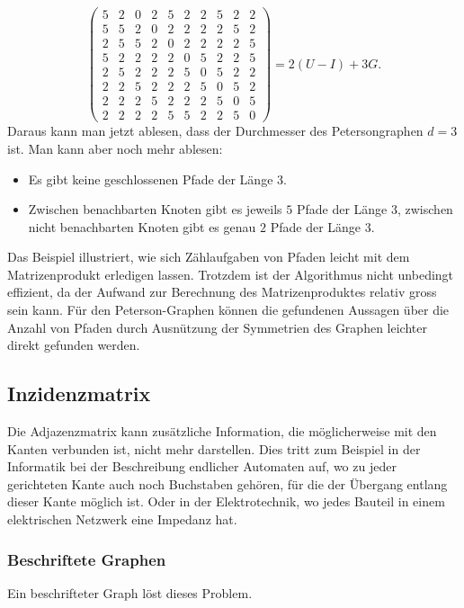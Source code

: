 \begin{beispiel}
\[\begin{pmatrix}
 5& 2& 0& 2& 5& 2& 2& 5& 2& 2\\
 5& 5& 2& 0& 2& 2& 2& 2& 5& 2\\
 2& 5& 5& 2& 0& 2& 2& 2& 2& 5\\
 5& 2& 2& 2& 2& 0& 5& 2& 2& 5\\
 2& 5& 2& 2& 2& 5& 0& 5& 2& 2\\
 2& 2& 5& 2& 2& 2& 5& 0& 5& 2\\
 2& 2& 2& 5& 2& 2& 2& 5& 0& 5\\
 2& 2& 2& 2& 5& 5& 2& 2& 5& 0
\end{pmatrix}
=
2(U-I) + 3G.
\]
Daraus kann man jetzt ablesen, dass der Durchmesser des Petersongraphen
$d=3$ ist.
Man kann aber noch mehr ablesen:
\begin{itemize}
\item
Es gibt keine geschlossenen Pfade der Länge $3$.
\item
Zwischen benachbarten Knoten gibt es jeweils $5$ Pfade der Länge $3$,
zwischen nicht benachbarten Knoten gibt es genau $2$ Pfade der Länge $3$.
\qedhere
\end{itemize}
\end{beispiel}

Das Beispiel illustriert, wie sich Zählaufgaben von Pfaden leicht mit dem
Matrizenprodukt erledigen lassen.
Trotzdem ist der Algorithmus nicht unbedingt effizient, da der Aufwand
zur Berechnung des Matrizenproduktes relativ gross sein kann.
Für den Peterson-Graphen können die gefundenen Aussagen über die Anzahl
von Pfaden durch Ausnützung der Symmetrien des Graphen leichter direkt
gefunden werden.


\subsection{Inzidenzmatrix
\label{buch:graphen:subsection:inzidenzmatrix}}
Die Adjazenzmatrix kann zusätzliche Information, die möglicherweise
mit den Kanten verbunden ist, nicht mehr darstellen.
Dies tritt zum Beispiel in der Informatik bei der Beschreibung
endlicher Automaten auf, wo zu jeder gerichteten Kante auch noch
Buchstaben gehören, für die der Übergang entlang dieser Kante
möglich ist.
Oder in der Elektrotechnik, wo jedes Bauteil in einem elektrischen
Netzwerk eine Impedanz hat.

\subsubsection{Beschriftete Graphen}
Ein beschrifteter Graph löst dieses Problem.

